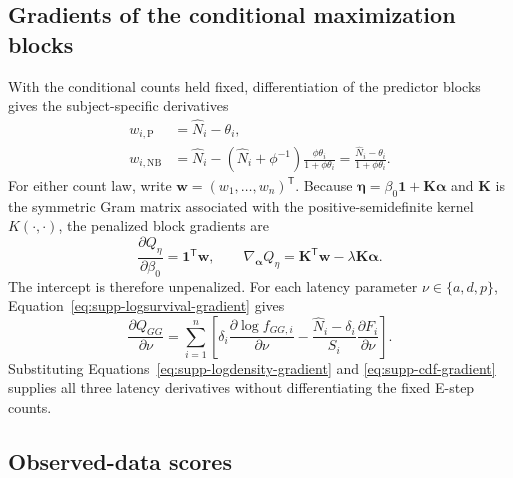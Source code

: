 \documentclass[11pt]{article}
\begin{document}
\subsection{Gradients of the conditional maximization blocks}

With the conditional counts held fixed, differentiation of the predictor blocks gives the subject-specific derivatives
\begin{equation}
\begin{aligned}
w_{i,\mathrm P}
&=\widehat N_i-\theta_i,\\
w_{i,\mathrm{NB}}
&=\widehat N_i-
(\widehat N_i+\phi^{-1})\frac{\phi\theta_i}{1+\phi\theta_i}
=\frac{\widehat N_i-\theta_i}{1+\phi\theta_i}.
\end{aligned}
\label{eq:supp-conditional-predictor-gradients}
\end{equation}
For either count law, write $\bm w=(w_1,\ldots,w_n)^{\mathsf T}$. Because $\bm\eta=\beta_0\bm1+\bm K\bm\alpha$ and $\bm K$ is the symmetric Gram matrix associated with the positive-semidefinite kernel $K(\cdot,\cdot)$, the penalized block gradients are
\begin{equation}
\frac{\partial Q_\eta}{\partial\beta_0}
=\bm1^{\mathsf T}\bm w,
\qquad
\nabla_{\bm\alpha}Q_\eta
=\bm K^{\mathsf T}\bm w-\lambda\bm K\bm\alpha.
\label{eq:supp-conditional-kernel-gradients}
\end{equation}
The intercept is therefore unpenalized. For each latency parameter $\nu\in\{a,d,p\}$, Equation~\eqref{eq:supp-logsurvival-gradient} gives
\begin{equation}
\frac{\partial Q_{GG}}{\partial\nu}
=\sum_{i=1}^{n}\left[
\delta_i\frac{\partial\log f_{GG,i}}{\partial\nu}
-\frac{\widehat N_i-\delta_i}{S_i}
\frac{\partial F_i}{\partial\nu}
\right].
\label{eq:supp-conditional-latency-gradient}
\end{equation}
Substituting Equations~\eqref{eq:supp-logdensity-gradient} and \eqref{eq:supp-cdf-gradient} supplies all three latency derivatives without differentiating the fixed E-step counts.

\subsection{Observed-data scores}
\end{document}
